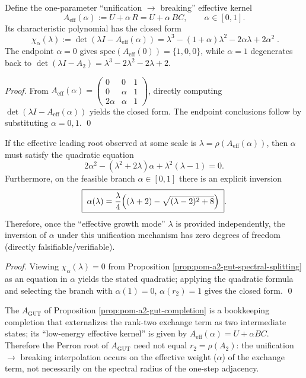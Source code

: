 \begin{proposition}\label{prop:pom-a2-gut-spectral-splitting}
Define the one-parameter ``unification \(\to\) breaking'' effective kernel
\[
A_{\mathrm{eff}}(\alpha):=U+\alpha\,R=U+\alpha\,BC,\qquad \alpha\in[0,1].
\]
Its characteristic polynomial has the closed form
\[
\boxed{\;
\chi_\alpha(\lambda)
:=\det(\lambda I-A_{\mathrm{eff}}(\alpha))
=
\lambda^3-(1+\alpha)\lambda^2-2\alpha\lambda+2\alpha^2\; }.
\]
The endpoint \(\alpha=0\) gives \(\mathrm{spec}(A_{\mathrm{eff}}(0))=\{1,0,0\}\), while \(\alpha=1\) degenerates back to
\(\det(\lambda I-A_2)=\lambda^3-2\lambda^2-2\lambda+2\).
\end{proposition}
\begin{proof}
From
\(
A_{\mathrm{eff}}(\alpha)=\begin{pmatrix}0&0&1\\0&\alpha&1\\2\alpha&\alpha&1\end{pmatrix}
\),
directly computing \(\det(\lambda I-A_{\mathrm{eff}}(\alpha))\) yields the closed form.
The endpoint conclusions follow by substituting \(\alpha=0,1\). \qed
\end{proof}

\begin{corollary}\label{cor:pom-a2-gut-invert-alpha}
If the effective leading root observed at some scale is \(\lambda=\rho(A_{\mathrm{eff}}(\alpha))\), then \(\alpha\) must satisfy the quadratic equation
\[
2\alpha^2-(\lambda^2+2\lambda)\alpha+\lambda^2(\lambda-1)=0.
\]
Furthermore, on the feasible branch \(\alpha\in[0,1]\) there is an explicit inversion
\[
\boxed{\;
\alpha(\lambda)=\frac{\lambda}{4}\Bigl((\lambda+2)-\sqrt{(\lambda-2)^2+8}\Bigr)\; }.
\]
Therefore, once the ``effective growth mode'' \(\lambda\) is provided independently, the inversion of \(\alpha\) under this unification mechanism has zero degrees of freedom (directly falsifiable/verifiable).
\end{corollary}
\begin{proof}
Viewing \(\chi_\alpha(\lambda)=0\) from Proposition \ref{prop:pom-a2-gut-spectral-splitting} as an equation in \(\alpha\) yields the stated quadratic; applying the quadratic formula and selecting the branch with \(\alpha(1)=0\), \(\alpha(r_2)=1\) gives the closed form. \qed
\end{proof}

\begin{remark}\label{rem:pom-a2-gut-mother-vs-effective}
The \(A_{\mathrm{GUT}}\) of Proposition \ref{prop:pom-a2-gut-completion} is a bookkeeping completion that externalizes the rank-two exchange term as two intermediate states;
its ``low-energy effective kernel'' is given by \(A_{\mathrm{eff}}(\alpha)=U+\alpha BC\).
Therefore the Perron root of \(A_{\mathrm{GUT}}\) need not equal \(r_2=\rho(A_2)\): the unification \(\to\) breaking interpolation occurs on the effective weight (\(\alpha\)) of the exchange term, not necessarily on the spectral radius of the one-step adjacency.
\end{remark}

